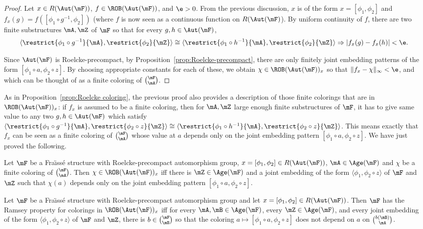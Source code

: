 \begin{proof}
Let $x\in R(\Aut(\mF))$, $f\in \ROB(\Aut(\mF))$, and $\e>0$. From the previous discussion, $x$ is of the form $x=[\phi_{1},\phi_{2}]$ and $f_{x}(g)=f([\phi_{1}\circ g^{-1},\phi_{2}])$ (where $f$ is now seen as a continuous function on $R(\Aut(\mF)$). By uniform continuity of $f$, there are two finite substructures $\mA, \mZ$ of $\mF$ so that for every $g,h\in \Aut(\mF)$,
\[
\langle\restrict{\phi_{1}\circ g^{-1}}{\mA}, \restrict{\phi_{2}}{\mZ}\rangle\cong\langle\restrict{\phi_{1}\circ h^{-1}}{\mA}, \restrict{\phi_{2}}{\mZ}\rangle \Rightarrow |f_{x}(g)-f_{x}(h)|<\e.
\]

Since $\Aut(\mF)$ is Roelcke-precompact, by Proposition~\ref{prop:Roelcke-precompact}, there are only finitely joint embedding patterns of the form $[\phi_{1}\circ a, \phi_{2}\circ z]$. By choosing appropriate constants for each of these, we obtain $\chi\in\ROB(\Aut(\mF))_{x}$ so that $\|f_{x}-\chi\|_{\infty}<\e$, and which can be thought of as a finite coloring of $\binom{\mF}{\mA}$.
\end{proof}

As in Proposition~\ref{prop:Roelcke coloring}, the previous proof also provides a description of those finite colorings that are in $\ROB(\Aut(\mF))_{x}$: if $f_{x}$ is assumed to be a finite coloring, then for $\mA, \mZ$ large enough finite substructures of $\mF$, it has to give same value to any two $g, h\in \Aut(\mF)$ which satisfy $\langle\restrict{\phi_{1}\circ g^{-1}}{\mA}, \restrict{\phi_{2}\circ z}{\mZ}\rangle\cong\langle\restrict{\phi_{1}\circ h^{-1}}{\mA}, \restrict{\phi_{2}\circ z}{\mZ}\rangle$. This means exactly that $f_{x}$ can be seen as a finite coloring of $\binom{\mF}{\mA}$ whose value at $a$ depends only on the joint embedding pattern $[\phi_{1}\circ a,\phi_{2}\circ z]$. We have just proved the following.

\begin{prop}\label{prop:Roelcke ext coloring}
Let $\mF$ be a Fra\"{\i}ss\'e structure with Roelcke-precompact automorphism group, $x=[\phi_{1},\phi_{2}]\in R(\Aut(\mF))$, $\mA\in \Age(\mF)$ and $\chi$ be a finite coloring of $\binom{\mF}{\mA}$. Then $\chi\in \ROB(\Aut(\mF))_{x}$ iff there is $\mZ\in \Age(\mF)$ and a joint embedding of the form $\langle \phi_{1}, \phi_{2}\circ z \rangle$ of $\mF$ and $\mZ$ such that $\chi(a)$ depends only on the joint embedding pattern $[\phi_{1}\circ a,\phi_{2}\circ z]$.
\end{prop}

\begin{prop}\label{prop:RPExtRoelcke}
Let $\mF$ be a Fra\"{\i}ss\'e structure with Roelcke-precompact automorphism group and let $x=[\phi_{1},\phi_{2}]\in R(\Aut(\mF))$. Then $\mF$ has the Ramsey property for colorings in $\ROB(\Aut(\mF))_{x}$ iff for every $\mA, \mB \in \Age(\mF)$, every $\mZ\in \Age(\mF)$, and every joint embedding of the form $\langle \phi_{1},\phi_{2}\circ z\rangle$ of $\mF$ and $\mZ$, there is $b\in \binom{\mF}{\mB}$ so that the coloring $a\mapsto [\phi_{1}\circ a,\phi_{2}\circ z]$ does not depend on $a$ on $\binom{b(\mB)}{\mA}$.
\end{prop}

